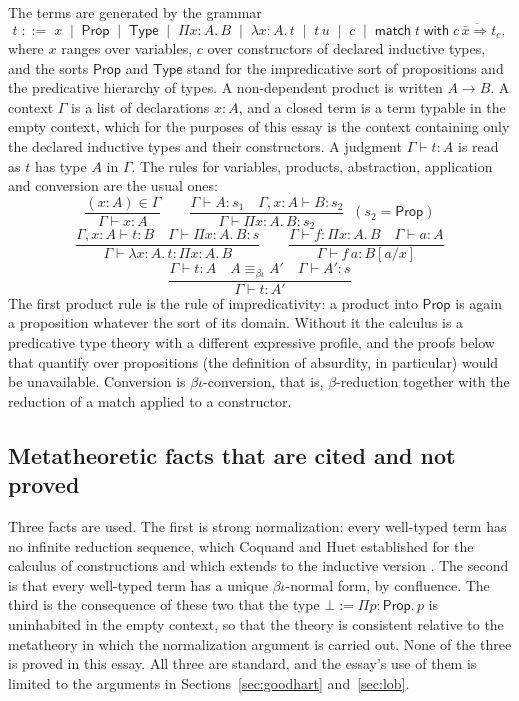 \documentclass[11pt]{article}
\theoremstyle{plain}
\theoremstyle{definition}
\theoremstyle{remark}
\newcommand{\Prp}{\mathsf{Prop}}
\newcommand{\Typ}{\mathsf{Type}}
\begin{document}
The terms are generated by the grammar
\[
t \;::=\; x \;\mid\; \Prp \;\mid\; \Typ \;\mid\; \Pi x{:}A.\,B \;\mid\; \lambda x{:}A.\,t \;\mid\; t\,u \;\mid\; c \;\mid\; \mathsf{match}\; t\; \mathsf{with}\; \overline{c\,\bar x \Rightarrow t_c},
\]
where $x$ ranges over variables, $c$ over constructors of declared inductive types, and the sorts $\Prp$ and $\Typ$ stand for the impredicative sort of propositions and the predicative hierarchy of types. A non-dependent product is written $A \to B$. A context $\Gamma$ is a list of declarations $x{:}A$, and a closed term is a term typable in the empty context, which for the purposes of this essay is the context containing only the declared inductive types and their constructors. A judgment $\Gamma \vdash t : A$ is read as $t$ has type $A$ in $\Gamma$. The rules for variables, products, abstraction, application and conversion are the usual ones:
\[
\dfrac{(x{:}A)\in\Gamma}{\Gamma\vdash x : A}\qquad
\dfrac{\Gamma\vdash A : s_1\quad \Gamma,x{:}A\vdash B : s_2}{\Gamma\vdash \Pi x{:}A.\,B : s_2}\;\;(s_2=\Prp)
\]
\[
\dfrac{\Gamma,x{:}A\vdash t : B\quad \Gamma\vdash \Pi x{:}A.\,B : s}{\Gamma\vdash \lambda x{:}A.\,t : \Pi x{:}A.\,B}\qquad
\dfrac{\Gamma\vdash f : \Pi x{:}A.\,B\quad \Gamma\vdash a : A}{\Gamma\vdash f\,a : B[a/x]}
\]
\[
\dfrac{\Gamma\vdash t : A\quad A\equiv_{\beta\iota} A'\quad \Gamma\vdash A' : s}{\Gamma\vdash t : A'}
\]
The first product rule is the rule of impredicativity: a product into $\Prp$ is again a proposition whatever the sort of its domain. Without it the calculus is a predicative type theory with a different expressive profile, and the proofs below that quantify over propositions (the definition of absurdity, in particular) would be unavailable. Conversion is $\beta\iota$-conversion, that is, $\beta$-reduction together with the reduction of a match applied to a constructor.

\subsection{Metatheoretic facts that are cited and not proved}

Three facts are used. The first is strong normalization: every well-typed term has no infinite reduction sequence, which Coquand and Huet established for the calculus of constructions and which extends to the inductive version \cite{coquandhuet1988,paulin1993}. The second is that every well-typed term has a unique $\beta\iota$-normal form, by confluence. The third is the consequence of these two that the type $\bot := \Pi p{:}\Prp.\,p$ is uninhabited in the empty context, so that the theory is consistent relative to the metatheory in which the normalization argument is carried out. None of the three is proved in this essay. All three are standard, and the essay's use of them is limited to the arguments in Sections~\ref{sec:goodhart} and~\ref{sec:lob}.
\end{document}
